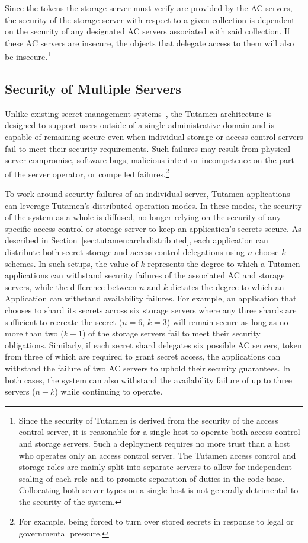 Since the tokens the storage server must verify are provided by the AC
servers, the security of the storage server with respect to a given
collection is dependent on the security of any designated AC servers
associated with said collection. If these AC servers are insecure, the
objects that delegate access to them will also be
insecure.\footnote{Since the security of Tutamen is derived from the
  security of the access control server, it is reasonable for a single
  host to operate both access control and storage servers. Such a
  deployment requires no more trust than a host who operates only an
  access control server. The Tutamen access control and storage roles
  are mainly split into separate servers to allow for independent
  scaling of each role and to promote separation of duties in the code
  base. Collocating both server types on a single host is not
  generally detrimental to the security of the system.}

\subsection{Security of Multiple Servers}

Unlike existing secret management systems~\cite{vault, confidant,
  keywhiz}, the Tutamen architecture is designed to support users
outside of a single administrative domain and is capable of remaining
secure even when individual storage or access control servers fail to
meet their security requirements. Such failures may result from
physical server compromise, software bugs, malicious intent or
incompetence on the part of the server operator, or compelled
failures.\footnote{For example, being forced to turn over stored
  secrets in response to legal or governmental pressure.}

To work around security failures of an individual server, Tutamen
applications can leverage Tutamen's distributed operation modes. In
these modes, the security of the system as a whole is diffused, no
longer relying on the security of any specific access control or
storage server to keep an application's secrets secure. As described
in Section~\ref{sec:tutamen:arch:distributed}, each application can
distribute both secret-storage and access control delegations using
$n$ choose $k$ schemes. In such setups, the value of $k$ represents
the degree to which a Tutamen applications can withstand security
failures of the associated AC and storage servers, while the
difference between $n$ and $k$ dictates the degree to which an
Application can withstand availability failures. For example, an
application that chooses to shard its secrets across six storage
servers where any three shards are sufficient to recreate the secret
($n=6$, $k=3$) will remain secure as long as no more than two ($k-1$)
of the storage servers fail to meet their security
obligations. Similarly, if each secret shard delegates six possible AC
servers, token from three of which are required to grant secret
access, the applications can withstand the failure of two AC servers
to uphold their security guarantees. In both cases, the system can
also withstand the availability failure of up to three servers ($n-k$)
while continuing to operate.

